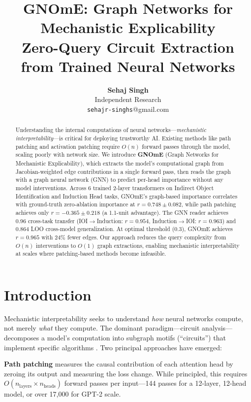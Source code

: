 \documentclass[11pt]{article}
\title{GNOmE: Graph Networks for Mechanistic Explicability\\[4pt]
\large Zero-Query Circuit Extraction from Trained Neural Networks}
\author{
\textbf{Sehaj Singh}\\
Independent Research\\
\texttt{sehajr-singhs}@gmail.com
}
\date{}
\begin{document}
\maketitle

\begin{abstract}
Understanding the internal computations of neural networks---\textit{mechanistic interpretability}---is critical for deploying trustworthy AI. Existing methods like path patching and activation patching require $O(n)$ forward passes through the model, scaling poorly with network size. We introduce \textbf{GNOmE} (Graph Networks for Mechanistic Explicability), which extracts the model's computational graph from Jacobian-weighted edge contributions in a single forward pass, then reads the graph with a graph neural network (GNN) to predict per-head importance without any model interventions. Across 6 trained 2-layer transformers on Indirect Object Identification and Induction Head tasks, GNOmE's graph-based importance correlates with ground-truth zero-ablation importance at $r = 0.748 \pm 0.082$, while path patching achieves only $r = -0.365 \pm 0.218$ (a 1.1-unit advantage). The GNN reader achieves 0.96 cross-task transfer (IOI$\to$Induction: $r = 0.954$, Induction$\to$IOI: $r = 0.963$) and 0.864 LOO cross-model generalization. At optimal threshold (0.3), GNOmE achieves $r = 0.965$ with 24\% fewer edges. Our approach reduces the query complexity from $O(n)$ interventions to $O(1)$ graph extractions, enabling mechanistic interpretability at scales where patching-based methods become infeasible.
\end{abstract}

\section{Introduction}

Mechanistic interpretability seeks to understand \emph{how} neural networks compute, not merely \emph{what} they compute. The dominant paradigm---circuit analysis---decomposes a model's computation into subgraph motifs (``circuits'') that implement specific algorithms \citep{olah2020zoom, elhage2021mathematical}. Two principal approaches have emerged:

\textbf{Path patching} \citep{wang2023interpretability} measures the causal contribution of each attention head by zeroing its output and measuring the loss change. While principled, this requires $O(n_\text{layers} \times n_\text{heads})$ forward passes per input---144 passes for a 12-layer, 12-head model, or over 17,000 for GPT-2 scale.
\end{document}
